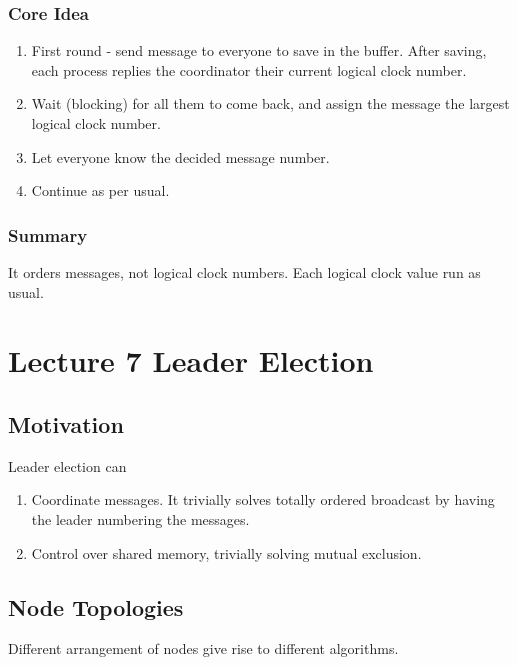 \documentclass[11pt]{article}
\begin{document}
\subsubsection{Core Idea}
\label{sec:org378a042}
\begin{enumerate}
\item First round - send message to everyone to save in the buffer. After saving,
each process replies the coordinator their current logical clock number.
\item Wait (blocking) for all them to come back, and assign the message the largest
logical clock number.
\item Let everyone know the decided message number.
\item Continue as per usual.
\end{enumerate}
\subsubsection{Summary}
\label{sec:org7234933}
It orders messages, not logical clock numbers. Each logical clock value run as
usual.
\section{Lecture 7 Leader Election}
\label{sec:orgf59fb88}
\subsection{Motivation}
\label{sec:orgd5e7562}
Leader election can
\begin{enumerate}
\item Coordinate messages. It trivially solves totally ordered broadcast by having
the leader numbering the messages.
\item Control over shared memory, trivially solving mutual exclusion.
\end{enumerate}
\subsection{Node Topologies}
\label{sec:orgfd4a97d}
Different arrangement of nodes give rise to different algorithms.
\end{document}
